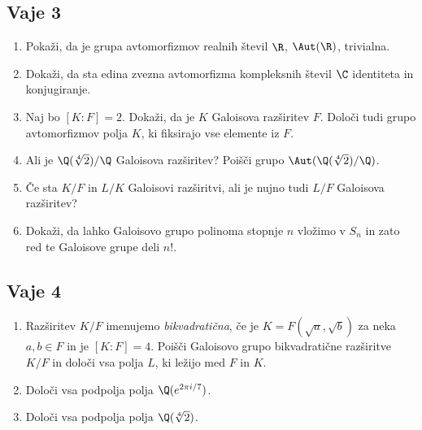 \subsection*{Vaje 3}

\begin{enumerate}
    \item Pokaži, da je grupa avtomorfizmov realnih števil $\R$, $\Aut(\R)$, trivialna.
    \item Dokaži, da sta edina zvezna avtomorfizma kompleksnih števil $\C$ identiteta in konjugiranje.
    \item Naj bo $[K : F] = 2$. Dokaži, da je $K$ Galoisova razširitev $F$. 
    Določi tudi grupo avtomorfizmov polja $K$, ki fiksirajo vse elemente iz $F$.
    \item Ali je $\Q(\sqrt[4]{2})/\Q$ Galoisova razširitev? 
    Poišči grupo $\Aut(\Q(\sqrt[4]{2})/\Q)$.
    \item Če sta $K/F$ in $L/K$ Galoisovi razširitvi, ali je nujno tudi $L/F$ Galoisova razširitev?
    \item Dokaži, da lahko Galoisovo grupo polinoma stopnje $n$ vložimo v $S_n$ in 
    zato red te Galoisove grupe deli $n!$.
\end{enumerate}


\newpage
\subsection*{Vaje 4}

\begin{enumerate}
    \item Razširitev $K/F$ imenujemo \emph{bikvadratična}, če je $K = F(\sqrt{a}, \sqrt{b})$ 
    za neka $a, b \in F$ in je $[K:F] = 4$. Poišči Galoisovo grupo bikvadratične razširitve 
    $K/F$ in določi vsa polja $L$, ki ležijo med $F$ in $K$.

    \item Določi vsa podpolja polja $\Q(e^{2\pi i/7})$.
    
    \item Določi vsa podpolja polja $\Q(\sqrt[4]{2})$.
\end{enumerate}

%

%
